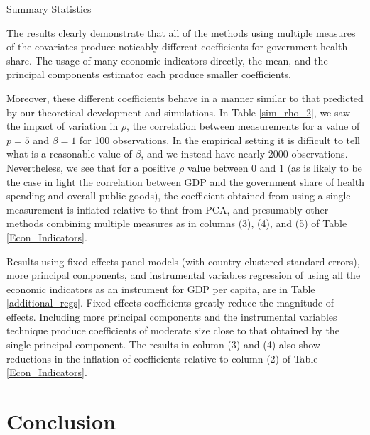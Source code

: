 \documentclass[12pt]{article}
\begin{document}
        

        \begin{table}[!htbp] \centering
            \caption{Summary Statistics \label{Sum_Stats}}
            
        \end{table}

        The results clearly demonstrate that all of the methods using multiple measures of the covariates produce noticably different coefficients for government health share. The usage of many economic indicators directly, the mean, and the principal components estimator each produce smaller coefficients.

        Moreover, these different coefficients behave in a manner similar to that predicted by our theoretical development and simulations. In Table \ref{sim_rho_2}, we saw the impact of variation in $\rho$, the correlation between measurements for a value of $p = 5$ and $\beta = 1$ for 100 observations. In the empirical setting it is difficult to tell what is a reasonable value of $\beta$, and we instead have nearly 2000 observations. Nevertheless, we see that for a positive $\rho$ value between 0 and 1 (as is likely to be the case in light the correlation between GDP and the government share of health spending and overall public goods), the coefficient obtained from using a single measurement is inflated relative to that from PCA, and presumably other methods combining multiple measures as in columns (3), (4), and (5) of Table \ref{Econ_Indicators}.

        Results using fixed effects panel models (with country clustered standard errors), more principal components, and instrumental variables regression of using all the economic indicators as an instrument for GDP per capita, are in Table \ref{additional_regs}. Fixed effects coefficients greatly reduce the magnitude of effects. Including more principal components and the instrumental variables technique produce coefficients of moderate size close to that obtained by the single principal component. The results in column (3) and (4) also show reductions in the inflation of coefficients relative to column (2) of Table \ref{Econ_Indicators}.

        

    \section*{Conclusion}
        
\end{document}
